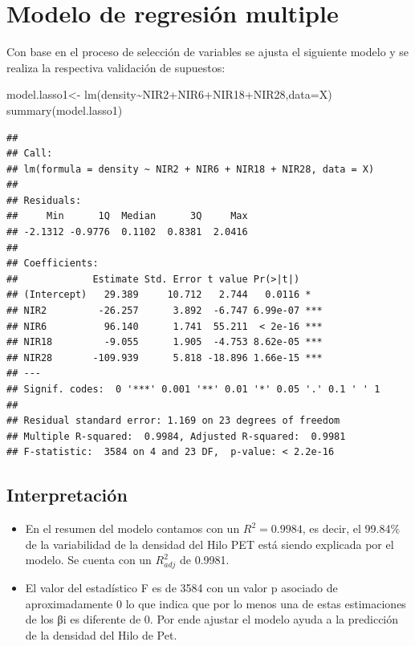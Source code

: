 \documentclass[
]{article}
\newenvironment{Shaded}{\begin{snugshade}}{\end{snugshade}}
\newcommand{\AttributeTok}[1]{\textcolor[rgb]{0.77,0.63,0.00}{#1}}
\newcommand{\FunctionTok}[1]{\textcolor[rgb]{0.00,0.00,0.00}{#1}}
\newcommand{\NormalTok}[1]{#1}
\newcommand{\OtherTok}[1]{\textcolor[rgb]{0.56,0.35,0.01}{#1}}
\newcommand{\SpecialCharTok}[1]{\textcolor[rgb]{0.00,0.00,0.00}{#1}}
\providecommand{\tightlist}{%
  \setlength{\itemsep}{0pt}\setlength{\parskip}{0pt}}
\begin{document}
\hypertarget{modelo-de-regresiuxf3n-multiple}{%
\section{Modelo de regresión
multiple}\label{modelo-de-regresiuxf3n-multiple}}

Con base en el proceso de selección de variables se ajusta el siguiente
modelo y se realiza la respectiva validación de supuestos:

\begin{Shaded}
\begin{Highlighting}[]
\NormalTok{model.lasso1}\OtherTok{\textless{}{-}} \FunctionTok{lm}\NormalTok{(density}\SpecialCharTok{\textasciitilde{}}\NormalTok{NIR2}\SpecialCharTok{+}\NormalTok{NIR6}\SpecialCharTok{+}\NormalTok{NIR18}\SpecialCharTok{+}\NormalTok{NIR28,}\AttributeTok{data=}\NormalTok{X)}
\FunctionTok{summary}\NormalTok{(model.lasso1)}
\end{Highlighting}
\end{Shaded}

\begin{verbatim}
## 
## Call:
## lm(formula = density ~ NIR2 + NIR6 + NIR18 + NIR28, data = X)
## 
## Residuals:
##     Min      1Q  Median      3Q     Max 
## -2.1312 -0.9776  0.1102  0.8381  2.0416 
## 
## Coefficients:
##             Estimate Std. Error t value Pr(>|t|)    
## (Intercept)   29.389     10.712   2.744   0.0116 *  
## NIR2         -26.257      3.892  -6.747 6.99e-07 ***
## NIR6          96.140      1.741  55.211  < 2e-16 ***
## NIR18         -9.055      1.905  -4.753 8.62e-05 ***
## NIR28       -109.939      5.818 -18.896 1.66e-15 ***
## ---
## Signif. codes:  0 '***' 0.001 '**' 0.01 '*' 0.05 '.' 0.1 ' ' 1
## 
## Residual standard error: 1.169 on 23 degrees of freedom
## Multiple R-squared:  0.9984, Adjusted R-squared:  0.9981 
## F-statistic:  3584 on 4 and 23 DF,  p-value: < 2.2e-16
\end{verbatim}

\hypertarget{interpretaciuxf3n}{%
\subsection{Interpretación}\label{interpretaciuxf3n}}

\begin{itemize}
\tightlist
\item
  En el resumen del modelo contamos con un \(R^2=0.9984\), es decir, el
  99.84\(\%\) de la variabilidad de la densidad del Hilo PET está siendo
  explicada por el modelo. Se cuenta con un \(R^2_{adj}\) de 0.9981.
\item
  El valor del estadístico F es de 3584 con un valor p asociado de
  aproximadamente 0 lo que indica que por lo menos una de estas
  estimaciones de los βi es diferente de 0. Por ende ajustar el modelo
  ayuda a la predicción de la densidad del Hilo de Pet.
\end{itemize}
\end{document}
